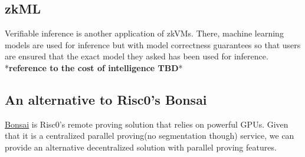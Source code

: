 \documentclass[a4paper, 10pt]{article}
\begin{document}
\subsection{zkML}
Verifiable inference is another application of zkVMs. There, machine learning models are used for inference but with model correctness guarantees so that users are ensured that the exact model they asked has been used for inference. *\textbf{reference to the cost of intelligence TBD}*

\subsection{An alternative to Risc0's Bonsai}
\href{https://dev.risczero.com/api/generating-proofs/remote-proving}{Bonsai} is Risc0's remote proving solution that relies on powerful GPUs. Given that it is a centralized parallel proving(no segmentation though) service, we can provide an  alternative decentralized solution with parallel proving features.
\end{document}
